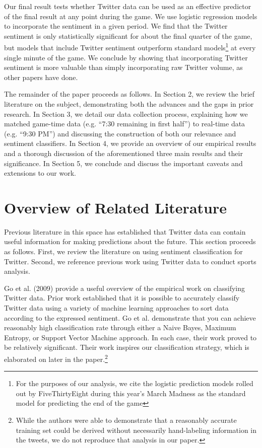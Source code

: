 \documentclass[12pt]{article}
\begin{document}
\begin{doublespacing}
Our final result tests whether Twitter data can be used as an effective predictor of the final result at any point during the game. We use logistic regression models to incorporate the sentiment in a given period. We find that the Twitter sentiment is only statistically significant for about the final quarter of the game, but models that include Twitter sentiment outperform standard models\footnote{For the purposes of our analysis, we cite the logistic prediction models rolled out by FiveThirtyEight during this year's March Madness as the standard model for predicting the end of the game} at every single minute of the game. We conclude by showing that incorporating Twitter sentiment is more valuable than simply incorporating raw Twitter volume, as other papers have done. 

The remainder of the paper proceeds as follows. In Section 2, we review the brief literature on the subject, demonstrating both the advances and the gaps in prior research. In Section 3, we detail our data collection process, explaining how we matched game-time data (e.g. ``7:30 remaining in first half'') to real-time data (e.g. ``9:30 PM'') and discussing the construction of both our relevance and sentiment classifiers. In Section 4, we provide an overview of our empirical results and a thorough discussion of the aforementioned three main results and their significance. In Section 5, we conclude and discuss the important caveats and extensions to our work. 

\section{Overview of Related Literature}

Previous literature in this space has established that Twitter data can contain useful information for making predictions about the future. This section proceeds as follows. First, we review the literature on using sentiment classification for Twitter. Second, we reference previous work using Twitter data to conduct sports analysis.

Go et al. (2009) provide a useful overview of the empirical work on classifying Twitter data. Prior work established that it is possible to accurately classify Twitter data using a variety of machine learning approaches to sort data according to the expressed sentiment. Go et al. demonstrate that you can achieve reasonably high classification rate through either a Naive Bayes, Maximum Entropy, or Support Vector Machine approach. In each case, their work proved to be relatively significant. Their work inspires our classification strategy, which is elaborated on later in the paper.\footnote{While the authors were able to demonstrate that a reasonably accurate training set could be derived without necessarily hand-labeling information in the tweets, we do not reproduce that analysis in our paper.}


\end{doublespacing}
\end{document}
